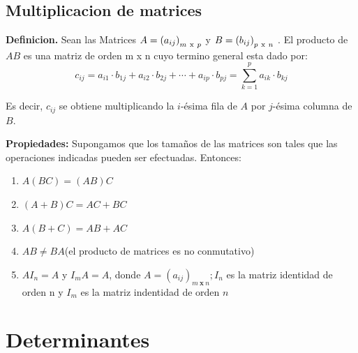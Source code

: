 \documentclass[11pt, conference]{IEEEtran}
\begin{document}
{\subsection{Multiplicacion de matrices}
\textbf{Definicion.} Sean las Matrices $A = \left(a_{ij}\right)_{m\ \textnormal{x}\ p}$ y $B = \left(b_{ij}\right)_{p\ \textnormal{x}\ n}$ . El producto de $AB$ es una matriz de orden m x n cuyo termino general esta dado por:
\[
	c_{ij} = a_{i1} \cdot b_{1j} + a_{i2} \cdot b_{2j} + \cdots + a_{ip} \cdot b_{pj} = \sum_{k=1}^{p}a_{ik}\cdot b_{kj}
\]
\begin{center}
Es decir, $c_{ij}$ se obtiene multiplicando la $i$-ésima fila de $A$ por $j$-ésima columna de $B$.
\end{center}
\textbf{Propiedades:} Supongamos que los tamaños de las matrices son tales que las operaciones indicadas pueden ser efectuadas. Entonces:
\begin{enumerate}
	\item $A(BC) = (AB)C$
    \item $(A+B)C = AC+BC$
    \item $A(B+C) = AB+AC$
    \item $AB\not=BA$(el producto de matrices es no conmutativo)
    \item $AI_{n} = A$ y $I_{m}A = A$, donde $A = (a_{ij})_{m\ \textbf{x}\ n}; I_{n}$ es la matriz identidad de orden n y $I_{m}$ es la matriz indentidad de orden $n$
\end{enumerate}
\bigskip
\bigskip
\bigskip
\section{Determinantes}

}
\end{document}
